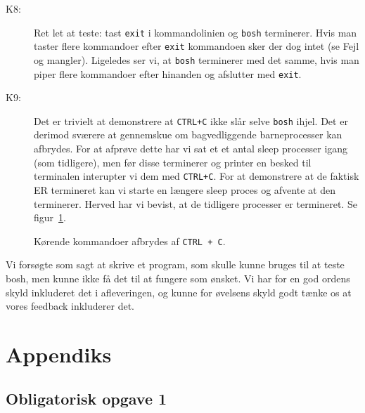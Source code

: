 \documentclass[final]{article}
\begin{document}
\begin{description}
\item[K8:] Ret let at teste: tast \texttt{exit} i kommandolinien og \texttt{bosh} terminerer. Hvis man taster flere kommandoer efter \texttt{exit} kommandoen sker der dog intet (se Fejl og mangler). Ligeledes ser vi, at \texttt{bosh} terminerer med det samme, hvis man piper flere kommandoer efter hinanden og afslutter med \texttt{exit}.

\item[K9:] Det er trivielt at demonstrere at \texttt{CTRL+C} ikke slår selve \texttt{bosh} ihjel. Det er derimod sværere at gennemskue om bagvedliggende barneprocesser kan afbrydes. For at afprøve dette har vi sat et et antal sleep processer igang (som tidligere), men før disse terminerer og printer en besked til terminalen interupter vi dem med \texttt{CTRL+C}. For at demonstrere at de faktisk ER termineret kan vi starte en længere sleep proces og afvente at den terminerer. Herved har vi bevist, at de tidligere processer er termineret. Se figur~\ref{fig:ctrlctest}.

\end{description}
\begin{figure}[H]
\center
{}
\caption{Kørende kommandoer afbrydes af \texttt{CTRL + C}.}
\label{fig:ctrlctest}
\end{figure}

Vi forsøgte som sagt at skrive et program, som skulle kunne bruges til at teste bosh, men kunne ikke få det til at fungere som ønsket. Vi har for en god ordens skyld inkluderet det i afleveringen, og kunne for øvelsens skyld godt tænke os at vores feedback inkluderer det.

\pagebreak
\appendix
\section{Appendiks}
\subsection{Obligatorisk opgave 1}

\end{document}
